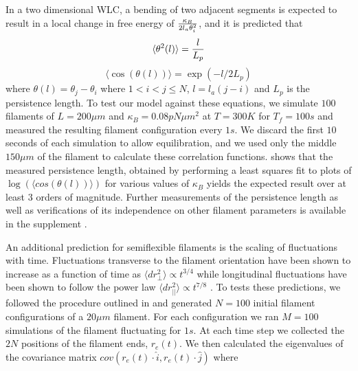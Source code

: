 \documentclass[12pt]{article}
\begin{document}
In a two dimensional WLC, a bending of two adjacent segments is expected to result in a local change in free energy of ${\kappa_B\over2l_a\theta_i^2}$, and it is predicted that \cite{frontali1979}
\begin{equation}
  \langle\theta^2(l)\rangle = {l\over L_p}
  \label{eqn:thsq}
\end{equation}
\begin{equation} 
  \langle\cos(\theta(l))\rangle = \exp{(-l/2L_p)}
  \label{eqn:costh}
\end{equation} 
where $\theta(l) = \theta_j - \theta_i$ where $1<i<j\le N$, $l = l_a(j-i)$ and $L_p$ is the persistence length. To test our model against these equations, we simulate $100$ filaments of $L=200\mu m$ and $\kappa_B=0.08 pN\mu m^2$ at $T=300K$ for $T_f = 100s$ and measured the resulting filament configuration every $1s$. We discard the first $10$ seconds of each simulation to allow equilibration, and we used only the middle $150 \mu m$ of the filament to calculate these correlation functions.
 shows that the measured persistence length, obtained by performing a least squares fit to plots of $\log{(\langle cos(\theta(l))\rangle )} $ for various values of $\kappa_B$ yields the expected result over at least $3$ orders of magnitude. Further measurements of the persistence length as well as verifications of its independence on other filament parameters is available in the supplement .
\par
An additional prediction for semiflexible filaments is the scaling of fluctuations with time. 
Fluctuations transverse to the filament orientation have been 
shown to increase as a function of time as $\langle dr_{\perp}^2\rangle\propto t^{3/4}$ while longitudinal fluctuations have been shown to follow the power law
$\langle dr_{||}^2\rangle\propto t^{7/8}$ \cite{everaers1999}. To tests these predictions, we followed the procedure outlined in
\cite{everaers1999} and generated $N = 100$ initial filament configurations of a $20\mu m$ filament. For each configuration we ran $M = 100$ simulations of the filament fluctuating for $1s$. At each time step we collected the $2N$ positions of the filament ends, $r_e(t)$. We then calculated the eigenvalues of the covariance matrix $cov(r_e(t)\cdot \hat{i},r_e(t)\cdot \hat{j})$ where
\end{document}
